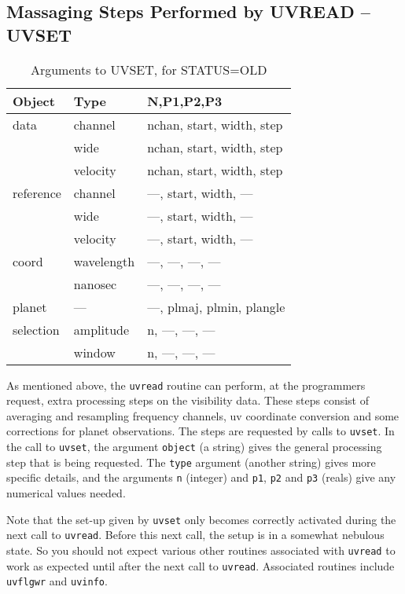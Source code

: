 \documentclass{report}
\begin{document}
\subsection{Massaging Steps Performed by UVREAD -- UVSET}
\label{sect:uvset}
\begin{table}\centering
\begin{tabular}{|l|l|l|}					   \hline
\bf Object	& \bf Type	& \bf N,P1,P2,P3		\\ \hline
data		& channel	& nchan, start, width, step	\\
		& wide		& nchan, start, width, step	\\
		& velocity	& nchan, start, width, step	\\
reference	& channel	&  ---, start, width, ---	\\
		& wide		&  ---, start, width, ---	\\
		& velocity	&  ---, start, width, ---	\\
coord		& wavelength	&  ---, ---, ---, ---		\\
		& nanosec	&  ---, ---, ---, ---		\\
planet		& ---		&  ---, plmaj, plmin, plangle	\\
selection	& amplitude	&  n, ---, ---, ---		\\
		& window	&  n, ---, ---, ---		\\ \hline
\end{tabular}
\caption{Arguments to UVSET, for STATUS=OLD}
\label{t:uvset-old}\end{table}
As mentioned above, the {\tt uvread} routine can perform, at the programmers
request, extra processing steps on the visibility data. These steps
consist of averaging and
resampling frequency channels, uv coordinate conversion and some corrections for
planet observations. The
steps are requested by calls to {\tt uvset}. In the call to {\tt uvset},
the argument {\tt object} (a string) gives the general processing step that
is being requested. The {\tt type} argument (another string)
gives more specific details, and the arguments {\tt n} (integer)
and {\tt p1}, {\tt p2} and {\tt p3} (reals) give any numerical values
needed.

Note that the set-up given by {\tt uvset} only becomes correctly
activated during the next call to {\tt uvread}. Before this next call,
the setup is in a somewhat nebulous state. So you should not expect
various other routines associated with {\tt uvread} to work
as expected until after the next call to {\tt uvread}. Associated
routines include {\tt uvflgwr} and {\tt uvinfo}.
\end{document}
